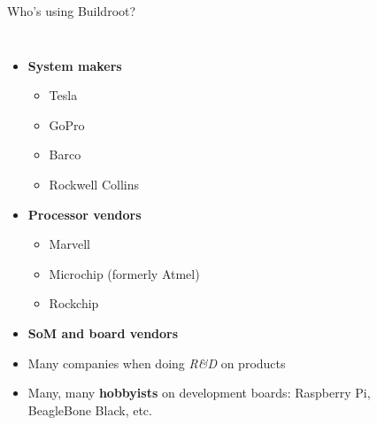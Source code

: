 \begin{frame}{Who's using Buildroot?}
  \begin{columns}
    \begin{itemize}
    \item {\bf System makers}
      \begin{itemize}
      \item Tesla
      \item GoPro
      \item Barco
      \item Rockwell Collins
      \end{itemize}
    \item {\bf Processor vendors}
      \begin{itemize}
      \item Marvell
      \item Microchip (formerly Atmel)
      \item Rockchip
      \end{itemize}
    \item {\bf SoM and board vendors}
    \item Many companies when doing {\em R\&D} on products
    \item Many, many {\bf hobbyists} on development boards:
      Raspberry Pi, BeagleBone Black, etc.
  \end{itemize}
  \\
  \\
  \end{columns}
\end{frame}

